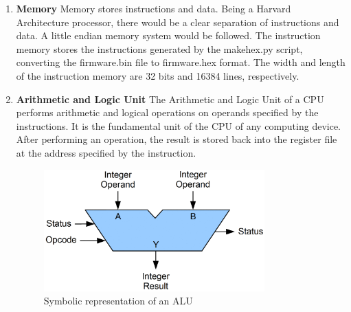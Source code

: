 \begin{enumerate}
\item \textbf{Memory} \newline
Memory stores instructions and data. Being a Harvard Architecture processor, there would be a clear separation of instructions and data. A little endian memory system would be followed. The instruction memory stores the instructions generated by the makehex.py script, converting the firmware.bin file to firmware.hex format. The width and length of the instruction memory are 32 bits and 16384 lines, respectively. 

\item \textbf{Arithmetic and Logic Unit} \newline
The Arithmetic and Logic Unit of a CPU performs arithmetic and logical operations on operands specified by the instructions. It is the fundamental unit of the CPU of any computing device. After performing an operation, the result is stored back into the register file at the address specified by the instruction.

\begin{figure}
\centering
\includegraphics[width=8.5cm]{figures/ALU_block.PNG}
\caption{Symbolic representation of an ALU}
\label{fig:riscv7}
\end{figure}

\end{enumerate}





